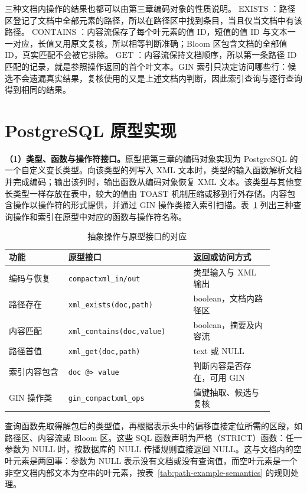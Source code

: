 三种文档内操作的结果也都可以由第三章编码对象的性质说明。$\operatorname{EXISTS}$：路径区登记了文档中全部元素的路径，所以在路径区中找到条目，当且仅当文档中有该路径。$\operatorname{CONTAINS}$：内容流保存了每个叶元素的值 ID，短值的值 ID 与文本一一对应，长值又用原文复核，所以相等判断准确；Bloom 区包含文档的全部值 ID，真实匹配不会被它排除。$\operatorname{GET}$：内容流保持文档顺序，所以第一条路径 ID 匹配的记录，就是参照操作返回的首个叶文本。GIN 索引只决定访问哪些行：候选不会遗漏真实结果，复核使用的又是上述文档内判断，因此索引查询与逐行查询得到相同的结果。

\section{PostgreSQL 原型实现}
\textbf{（1）类型、函数与操作符接口。}原型把第三章的编码对象实现为 PostgreSQL 的一个自定义变长类型。向该类型的列写入 XML 文本时，类型的输入函数解析文档并完成编码；输出该列时，输出函数从编码对象恢复 XML 文本。该类型与其他变长类型一样存放在表中，较大的值由 TOAST 机制压缩或移到行外存储\cite{pg16toast}。内容包含操作以操作符的形式提供，并通过 GIN 操作类接入索引扫描\cite{pg16gin}。表~\ref{tab:prototype-interfaces} 列出三种查询操作和索引在原型中对应的函数与操作符名称。
\begin{table}[htbp]
\centering\small
\caption{抽象操作与原型接口的对应}
\label{tab:prototype-interfaces}
\begin{tabular}{p{0.20\linewidth}p{0.42\linewidth}p{0.27\linewidth}}
\toprule
功能 & 原型接口 & 返回或访问方式 \\
\midrule
编码与恢复 & \texttt{compactxml\_in/out} & 类型输入与 XML 输出 \\
路径存在 & \texttt{xml\_exists(doc,path)} & boolean，文档内路径区 \\
内容匹配 & \texttt{xml\_contains(doc,value)} & boolean，摘要及内容流 \\
路径首值 & \texttt{xml\_get(doc,path)} & text 或 NULL \\
索引内容包含 & \texttt{doc @> value} & 判断内容是否存在，可用 GIN \\
GIN 操作类 & \texttt{gin\_compactxml\_ops} & 值键抽取、候选与复核 \\
\bottomrule
\end{tabular}
\end{table}
查询函数先取得解包后的类型值，再根据表示头中的偏移直接定位所需的区段，如路径区、内容流或 Bloom 区。这些 SQL 函数声明为严格（STRICT）函数：任一参数为 NULL 时，按数据库的 NULL 传播规则直接返回 NULL。这与文档内的空叶元素是两回事：参数为 NULL 表示没有文档或没有查询值，而空叶元素是一个非空文档内部文本为空串的叶元素，按表~\ref{tab:path-example-semantics} 的规则处理。

